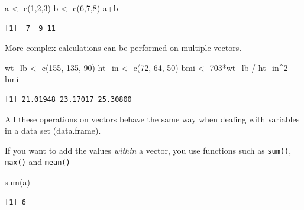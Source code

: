 \documentclass[
  letterpaper,
  DIV=11,
  numbers=noendperiod,
  oneside]{scrreprt}
\newenvironment{Shaded}{\begin{snugshade}}{\end{snugshade}}
\newcommand{\DecValTok}[1]{\textcolor[rgb]{0.68,0.00,0.00}{#1}}
\newcommand{\FunctionTok}[1]{\textcolor[rgb]{0.28,0.35,0.67}{#1}}
\newcommand{\NormalTok}[1]{\textcolor[rgb]{0.00,0.23,0.31}{#1}}
\newcommand{\OtherTok}[1]{\textcolor[rgb]{0.00,0.23,0.31}{#1}}
\newcommand{\SpecialCharTok}[1]{\textcolor[rgb]{0.37,0.37,0.37}{#1}}
\begin{document}
\begin{Shaded}
\begin{Highlighting}[]
\NormalTok{a }\OtherTok{\textless{}{-}} \FunctionTok{c}\NormalTok{(}\DecValTok{1}\NormalTok{,}\DecValTok{2}\NormalTok{,}\DecValTok{3}\NormalTok{)}
\NormalTok{b }\OtherTok{\textless{}{-}} \FunctionTok{c}\NormalTok{(}\DecValTok{6}\NormalTok{,}\DecValTok{7}\NormalTok{,}\DecValTok{8}\NormalTok{)}
\NormalTok{a}\SpecialCharTok{+}\NormalTok{b}
\end{Highlighting}
\end{Shaded}

\begin{verbatim}
[1]  7  9 11
\end{verbatim}

More complex calculations can be performed on multiple vectors.

\begin{Shaded}
\begin{Highlighting}[]
\NormalTok{wt\_lb }\OtherTok{\textless{}{-}} \FunctionTok{c}\NormalTok{(}\DecValTok{155}\NormalTok{, }\DecValTok{135}\NormalTok{, }\DecValTok{90}\NormalTok{)}
\NormalTok{ht\_in }\OtherTok{\textless{}{-}} \FunctionTok{c}\NormalTok{(}\DecValTok{72}\NormalTok{, }\DecValTok{64}\NormalTok{, }\DecValTok{50}\NormalTok{)}
\NormalTok{bmi }\OtherTok{\textless{}{-}} \DecValTok{703}\SpecialCharTok{*}\NormalTok{wt\_lb }\SpecialCharTok{/}\NormalTok{ ht\_in}\SpecialCharTok{\^{}}\DecValTok{2}
\NormalTok{bmi}
\end{Highlighting}
\end{Shaded}

\begin{verbatim}
[1] 21.01948 23.17017 25.30800
\end{verbatim}

All these operations on vectors behave the same way when dealing with
variables in a data set (data.frame).

If you want to add the values \emph{within} a vector, you use functions
such as \texttt{sum()}, \texttt{max()} and \texttt{mean()}

\begin{Shaded}
\begin{Highlighting}[]
\FunctionTok{sum}\NormalTok{(a)}
\end{Highlighting}
\end{Shaded}

\begin{verbatim}
[1] 6
\end{verbatim}
\end{document}
